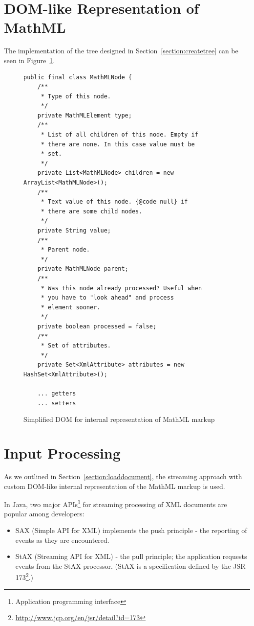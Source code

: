 \documentclass[11pt,oneside,final]{fithesis2}
\begin{document}
\section{DOM-like Representation of MathML}
The implementation of the tree designed in Section~\ref{section:createtree} can be seen in Figure~\ref{fig:customdom}.

\begin{figure}[!ht]
\begin{lstlisting}
public final class MathMLNode {
    /**
     * Type of this node.
     */
    private MathMLElement type;
    /**
     * List of all children of this node. Empty if 
     * there are none. In this case value must be 
     * set.
     */
    private List<MathMLNode> children = new ArrayList<MathMLNode>();
    /**
     * Text value of this node. {@code null} if 
     * there are some child nodes.
     */
    private String value;
    /**
     * Parent node.
     */
    private MathMLNode parent;
    /**
     * Was this node already processed? Useful when 
     * you have to "look ahead" and process
     * element sooner.
     */
    private boolean processed = false;
    /**
     * Set of attributes.
     */
    private Set<XmlAttribute> attributes = new HashSet<XmlAttribute>();
    
    ... getters
    ... setters
\end{lstlisting}
\caption{Simplified DOM for internal representation of MathML markup}
\label{fig:customdom}
\end{figure}

\section{Input Processing}
As we outlined in Section~\ref{section:loaddocument}, the streaming approach with custom DOM-like internal representation of the MathML markup is used. 

In Java, two major APIs\footnote{Application programming interface} for streaming processing of XML documents are popular among developers:
\begin{itemize}
\item SAX (Simple API for XML) implements the push principle - the reporting of events as they are encountered.
\item StAX (Streaming API for XML) - the pull principle; the application requests events from the StAX processor. (StAX is a specification defined by the JSR 173\footnote{\url{http://www.jcp.org/en/jsr/detail?id=173}}.)
\end{itemize}
\end{document}
